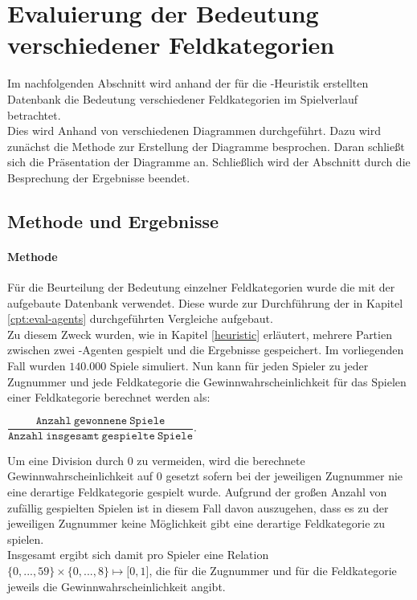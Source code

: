 \section{Evaluierung der Bedeutung verschiedener Feldkategorien}
Im nachfolgenden Abschnitt wird anhand der für die -Heuristik erstellten Datenbank die Bedeutung verschiedener Feldkategorien im Spielverlauf betrachtet.
\\Dies wird Anhand von verschiedenen Diagrammen durchgeführt. Dazu wird zunächst die Methode zur Erstellung der Diagramme besprochen. Daran schließt sich die Präsentation der Diagramme an. Schließlich wird der Abschnitt durch die Besprechung der Ergebnisse beendet.
\subsection{Methode und Ergebnisse}
\paragraph{Methode}
Für die Beurteilung der Bedeutung einzelner Feldkategorien wurde die mit der  aufgebaute Datenbank verwendet. Diese wurde zur Durchführung der in Kapitel \ref{cpt:eval-agents} durchgeführten Vergleiche aufgebaut.
\\Zu diesem Zweck wurden, wie in Kapitel \ref{heuristic} erläutert, mehrere Partien zwischen zwei -Agenten gespielt und die Ergebnisse gespeichert. Im vorliegenden Fall wurden $140.000$ Spiele simuliert. Nun kann für jeden Spieler zu jeder Zugnummer und jede Feldkategorie die Gewinnwahrscheinlichkeit für das Spielen einer Feldkategorie berechnet werden als: 
\vspace{0.25cm}
\begin{center}
$\dfrac{\mathtt{Anzahl\ gewonnene\ Spiele}}{\mathtt{Anzahl\ insgesamt\ gespielte\ Spiele}}$.
\end{center}
\vspace{0.25cm}
Um eine Division durch $0$ zu vermeiden, wird die berechnete Gewinnwahrscheinlichkeit auf $0$ gesetzt sofern bei der jeweiligen Zugnummer nie eine derartige Feldkategorie gespielt wurde. Aufgrund der großen Anzahl von zufällig gespielten Spielen ist in diesem Fall davon auszugehen, dass es zu der jeweiligen Zugnummer keine Möglichkeit gibt eine derartige Feldkategorie zu spielen. 
\\Insgesamt ergibt sich damit pro Spieler eine Relation $\lbrace0, ..., 59\rbrace\times\lbrace0, ..., 8\rbrace\mapsto\lbrack0,1\rbrack$, die für die Zugnummer und für die Feldkategorie jeweils die Gewinnwahrscheinlichkeit angibt.
  
